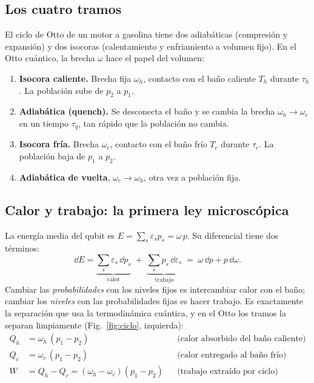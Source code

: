 \subsection{Los cuatro tramos}

El ciclo de Otto de un motor a gasolina tiene dos adiabáticas (compresión y expansión) y dos
isocoras (calentamiento y enfriamiento a volumen fijo). En el Otto cuántico, la brecha $\omega$ hace
el papel del volumen:
\begin{enumerate}
\item \textbf{Isocora caliente.} Brecha fija $\omega_h$, contacto con el baño caliente $T_h$ durante
  $\tau_h$. La población sube de $p_2$ a $p_1$.
\item \textbf{Adiabática (quench).} Se desconecta el baño y se cambia la brecha $\omega_h\to\omega_c$
  en un tiempo $\tau_q$, tan rápido que la población no cambia.
\item \textbf{Isocora fría.} Brecha $\omega_c$, contacto con el baño frío $T_c$ durante $\tau_c$. La
  población baja de $p_1$ a $p_2$.
\item \textbf{Adiabática de vuelta}, $\omega_c\to\omega_h$, otra vez a población fija.
\end{enumerate}

\subsection{Calor y trabajo: la primera ley microscópica}

La energía media del qubit es $E = \sum_s \varepsilon_s p_s = \omega\,p$. Su diferencial tiene dos
términos:
\begin{equation}
\dd E = \underbrace{\sum_s \varepsilon_s\,\dd p_s}_{\text{calor}} \;+\;
\underbrace{\sum_s p_s\,\dd\varepsilon_s}_{\text{trabajo}}
\;=\; \omega\,\dd p + p\,\dd\omega .
\end{equation}
Cambiar las \emph{probabilidades} con los niveles fijos es intercambiar calor con el baño; cambiar
los \emph{niveles} con las probabilidades fijas es hacer trabajo. Es exactamente la separación que
usa la termodinámica cuántica, y en el Otto los tramos la separan limpiamente
(Fig.~\ref{fig:ciclo}, izquierda):
\begin{align}
Q_h &= \omega_h\,(p_1 - p_2) &&\text{(calor absorbido del baño caliente)}\\
Q_c &= \omega_c\,(p_1 - p_2) &&\text{(calor entregado al baño frío)}\\
W   &= Q_h - Q_c = (\omega_h - \omega_c)(p_1 - p_2) &&\text{(trabajo extraído por ciclo)}
\end{align}

